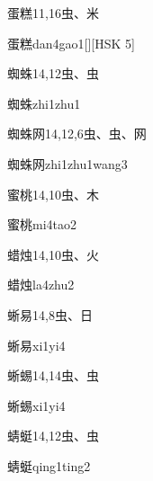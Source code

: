 \begin{entry}{蛋糕}{11,16}{⾍、⽶}
  \begin{phonetics}{蛋糕}{dan4gao1}[][HSK 5]
  \end{phonetics}
\end{entry}

\begin{entry}{蜘蛛}{14,12}{⾍、⾍}
  \begin{phonetics}{蜘蛛}{zhi1zhu1}
  \end{phonetics}
\end{entry}

\begin{entry}{蜘蛛网}{14,12,6}{⾍、⾍、⽹}
  \begin{phonetics}{蜘蛛网}{zhi1zhu1wang3}
  \end{phonetics}
\end{entry}

\begin{entry}{蜜桃}{14,10}{⾍、⽊}
  \begin{phonetics}{蜜桃}{mi4tao2}
  \end{phonetics}
\end{entry}

\begin{entry}{蜡烛}{14,10}{⾍、⽕}
  \begin{phonetics}{蜡烛}{la4zhu2}
  \end{phonetics}
\end{entry}

\begin{entry}{蜥易}{14,8}{⾍、⽇}
  \begin{phonetics}{蜥易}{xi1yi4}
  \end{phonetics}
\end{entry}

\begin{entry}{蜥蜴}{14,14}{⾍、⾍}
  \begin{phonetics}{蜥蜴}{xi1yi4}
  \end{phonetics}
\end{entry}

\begin{entry}{蜻蜓}{14,12}{⾍、⾍}
  \begin{phonetics}{蜻蜓}{qing1ting2}
  \end{phonetics}
\end{entry}


